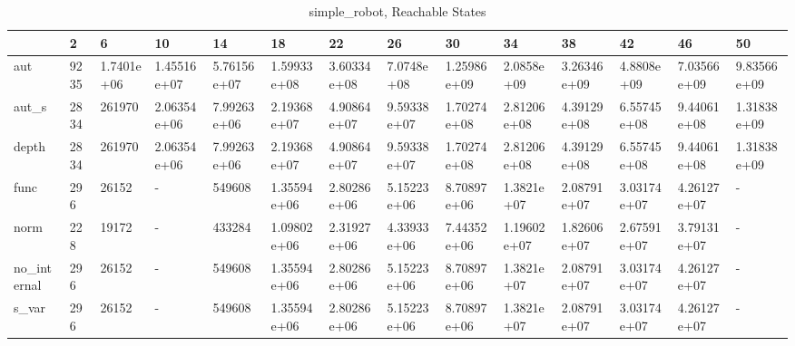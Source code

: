 \begin{table}
\caption{simple_robot, Reachable States}
\label{simple_robot_reach}
\begin{tabular}{llllllllllllll}
\toprule
 & 2 & 6 & 10 & 14 & 18 & 22 & 26 & 30 & 34 & 38 & 42 & 46 & 50 \\
\midrule
aut & 9235 & 1.7401e+06 & 1.45516e+07 & 5.76156e+07 & 1.59933e+08 & 3.60334e+08 & 7.0748e+08 & 1.25986e+09 & 2.0858e+09 & 3.26346e+09 & 4.8808e+09 & 7.03566e+09 & 9.83566e+09 \\
aut_s & 2834 & 261970 & 2.06354e+06 & 7.99263e+06 & 2.19368e+07 & 4.90864e+07 & 9.59338e+07 & 1.70274e+08 & 2.81206e+08 & 4.39129e+08 & 6.55745e+08 & 9.44061e+08 & 1.31838e+09 \\
depth & 2834 & 261970 & 2.06354e+06 & 7.99263e+06 & 2.19368e+07 & 4.90864e+07 & 9.59338e+07 & 1.70274e+08 & 2.81206e+08 & 4.39129e+08 & 6.55745e+08 & 9.44061e+08 & 1.31838e+09 \\
func & 296 & 26152 & - & 549608 & 1.35594e+06 & 2.80286e+06 & 5.15223e+06 & 8.70897e+06 & 1.3821e+07 & 2.08791e+07 & 3.03174e+07 & 4.26127e+07 & - \\
norm & 228 & 19172 & - & 433284 & 1.09802e+06 & 2.31927e+06 & 4.33933e+06 & 7.44352e+06 & 1.19602e+07 & 1.82606e+07 & 2.67591e+07 & 3.79131e+07 & - \\
no_internal & 296 & 26152 & - & 549608 & 1.35594e+06 & 2.80286e+06 & 5.15223e+06 & 8.70897e+06 & 1.3821e+07 & 2.08791e+07 & 3.03174e+07 & 4.26127e+07 & - \\
s_var & 296 & 26152 & - & 549608 & 1.35594e+06 & 2.80286e+06 & 5.15223e+06 & 8.70897e+06 & 1.3821e+07 & 2.08791e+07 & 3.03174e+07 & 4.26127e+07 & - \\
\bottomrule
\end{tabular}
\end{table}
